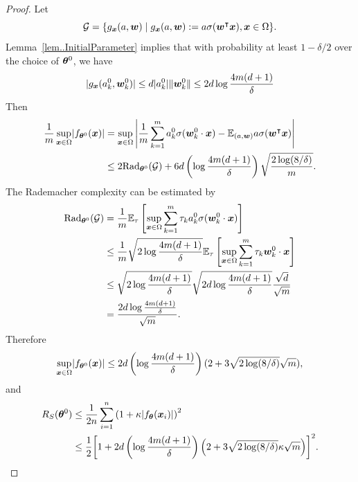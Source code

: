 \documentclass{article}
\begin{document}
\begin{proof}
    Let
    \begin{equation}
        \mathcal{G} = \{g_{\bm{x}}(a,\bm{w}) \mid g_{\bm{x}}(a,\bm{w}):=a\sigma(\bm{w}^\intercal\bm{x}),\bm{x}\in\Omega \}.
    \end{equation}
    Lemma~\ref{lem..InitialParameter} implies that with probability at least $1-\delta/2$ over the choice of $\bm{\theta}^0$, we have
    \begin{equation*}
        \lvert g_{\bm{x}}(a^0_k,\bm{w}^0_k)\rvert\leq d\lvert a_k^0\rvert\lVert\bm{w}^0_k\rVert\leq 2d\log\frac{4m(d+1)}{\delta}
    \end{equation*}
    Then
    \begin{equation*}
        \begin{aligned}
            \frac{1}{ m}\sup_{\bm{x}\in\Omega}\lvert f_{\bm{\theta}^0}(\bm{x})\rvert
             & =\sup_{\bm{x}\in\Omega}\left\lvert \frac{1}{m}\sum_{k=1}^m a_k^0\sigma(\bm{w}_k^0\cdot\bm{x})-\mathbb{E}_{(a,\bm{w})}a\sigma(\bm{w}^\intercal\bm{x})\right\rvert \\
             & \leq 2\mathrm{Rad}_{\bm{\theta}^0}(\mathcal{G}) + 6d \left(\log\frac{4m(d+1)}{\delta}\right)\sqrt{\frac{2\log(8/\delta)}{m}}.
        \end{aligned}
    \end{equation*}
    The Rademacher complexity can be estimated by
    \begin{equation*}
        \begin{aligned}
            \mathrm{Rad}_{\bm{\theta}^0}(\mathcal{G})
             & =\frac{1}{m}\mathbb{E}_{\tau}\left[\sup_{\bm{x}\in\Omega}\sum_{k=1}^m\tau_ka^0_k\sigma(\bm{w}^0_k\cdot\bm{x})\right]   \\
             & \leq\frac{1}{m}\sqrt{2\log\frac{4m(d+1)}{\delta}}\mathbb{E}_{\tau}\left[\sup_{\bm{x}\in\Omega}\sum_{k=1}^m\tau_k
            \bm{w}_k^0\cdot\bm{x}\right]                                                                                     \\
             & \leq\sqrt{2\log\frac{4m(d+1)}{\delta}}\sqrt{2d\log\frac{4m(d+1)}{\delta}}\frac{\sqrt{d}}{\sqrt{m}}      \\
             & =\frac{2d\log\frac{4m(d+1)}{\delta}}{\sqrt{m}}.
        \end{aligned}
    \end{equation*}
    Therefore
    \begin{equation*}
        \sup_{\bm{x}\in\Omega}\lvert f_{\bm{\theta}^0}(\bm{x})\rvert\leq 2d\left(\log\frac{4m(d+1)}{\delta}\right)(2+3\sqrt{2\log(8/\delta)}\sqrt{m}),
    \end{equation*}
    and
    \begin{equation*}
        \begin{aligned}
            R_S(\bm{\theta}^0)
             & \leq\frac{1}{2n}\sum_{i=1}^n{\left(1+\kappa\lvert f_{\bm{\theta}}(\bm{x}_i)\rvert\right)}^2                                                    \\
             & \leq\frac{1}{2}{\left[1+2d\left(\log\frac{4m(d+1)}{\delta}\right)\left(2+3\sqrt{2\log(8/\delta)}\kappa\sqrt{m}\right)\right]}^2.
        \end{aligned}
    \end{equation*}
\end{proof}
\end{document}
